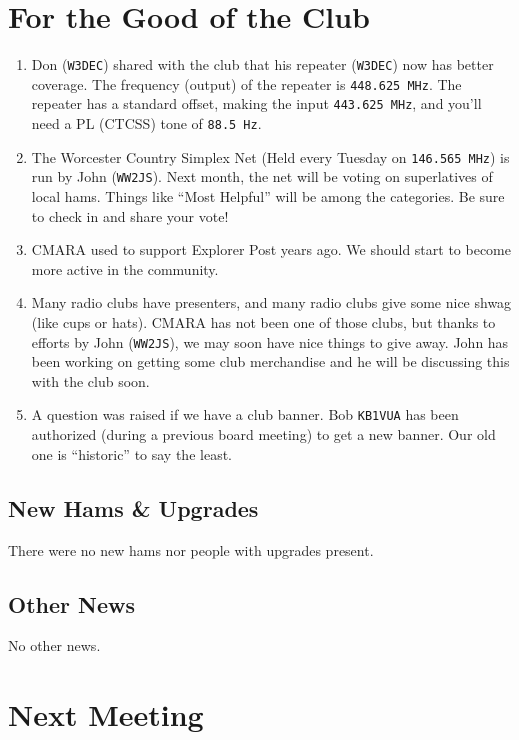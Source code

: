 \documentclass[10pt,letterpaper]{article}
\begin{document}
\section{For the Good of the Club}

\begin{enumerate}
\item Don (\texttt{W3DEC}) shared with the club that his repeater (\texttt{W3DEC}) now has better coverage. The frequency (output) of the repeater is \texttt{448.625 MHz}. The repeater has a standard offset, making the input \texttt{443.625 MHz}, and you'll need a PL (CTCSS) tone of \texttt{88.5 Hz}.
\item The Worcester Country Simplex Net (Held every Tuesday on \texttt{146.565 MHz}) is run by John (\texttt{WW2JS}). Next month, the net will be voting on superlatives of local hams. Things like ``Most Helpful'' will be among the categories. Be sure to check in and share your vote!
\item CMARA used to support Explorer Post years ago. We should start to become more active in the community.
\item Many radio clubs have presenters, and many radio clubs give some nice shwag (like cups or hats). CMARA has not been one of those clubs, but thanks to efforts by John (\texttt{WW2JS}), we may soon have nice things to give away. John has been working on getting some club merchandise and he will be discussing this with the club soon.
\item A question was raised if we have a club banner. Bob \texttt{KB1VUA} has been authorized (during a previous board meeting) to get a new banner. Our old one is ``historic'' to say the least.
\end{enumerate}

\subsection{New Hams \& Upgrades}

There were no new hams nor people with upgrades present.


\subsection{Other News}

No other news.

\section{Next Meeting}
\end{document}
